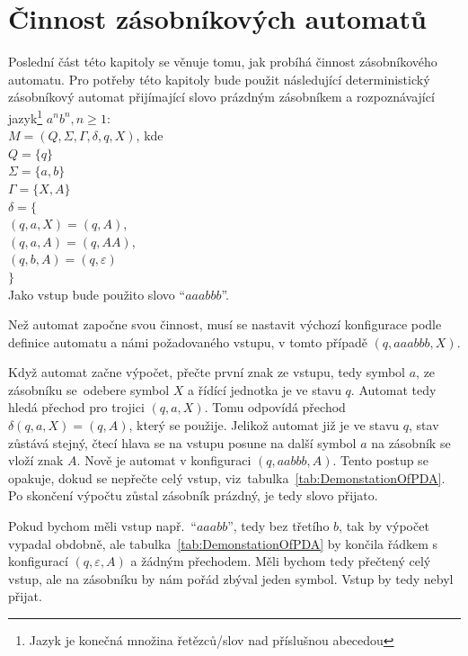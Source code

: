 \section{Činnost zásobníkových automatů}

Poslední část této kapitoly se věnuje tomu, jak probíhá činnost zásobníkového automatu. Pro potřeby této kapitoly bude použit následující deterministický zásobníkový automat přijímající slovo prázdným zásobníkem a rozpoznávající jazyk\footnote{Jazyk je konečná množina řetězců/slov nad příslušnou abecedou} $a^{n}b^{n}, n \ge 1$:\\
$M = (Q, \Sigma, \Gamma, \delta, q, X)$, kde \\
\indent$Q = \{q\}$\\
\indent$\Sigma = \{a,b\}$\\
\indent$\Gamma = \{X,A\}$\\
\indent$\delta = \{$\\
\indent\indent$(q,a,X) = (q,A)$,\\
\indent\indent$(q,a,A) = (q,AA)$,\\
\indent\indent$(q,b,A) = (q,\varepsilon)$\\
\indent$\}$\\
Jako vstup bude použito slovo ``$aaabbb$''.

Než automat započne svou činnost, musí se nastavit výchozí konfigurace podle definice automatu a námi požadovaného vstupu, v tomto případě $(q,aaabbb,X)$. 

Když automat začne výpočet, přečte první znak ze vstupu, tedy symbol $a$, ze zásobníku se~odebere symbol $X$ a řídící jednotka je ve stavu $q$. Automat tedy hledá přechod pro trojici $(q,a,X)$. Tomu odpovídá přechod $\delta(q,a,X) = (q,A)$, který se použije. Jelikož automat již je ve stavu $q$, stav zůstává stejný, čtecí hlava se na vstupu posune na další symbol $a$ na zásobník se vloží znak $A$. Nově je automat v konfiguraci $(q,aabbb,A)$. Tento postup se opakuje, dokud se nepřečte celý vstup, viz~tabulka~\ref{tab:DemonstationOfPDA}.~\cite{Kozen1997} Po skončení výpočtu zůstal zásobník prázdný, je tedy slovo přijato. 

Pokud bychom měli vstup např.\ ``$aaabb$'', tedy bez třetího $b$, tak by výpočet vypadal obdobně, ale tabulka~\ref{tab:DemonstationOfPDA} by končila řádkem s konfigurací $(q,\varepsilon,A)$ a žádným přechodem. Měli bychom tedy přečtený celý vstup, ale na zásobníku by nám pořád zbýval jeden symbol. Vstup by tedy nebyl přijat.


